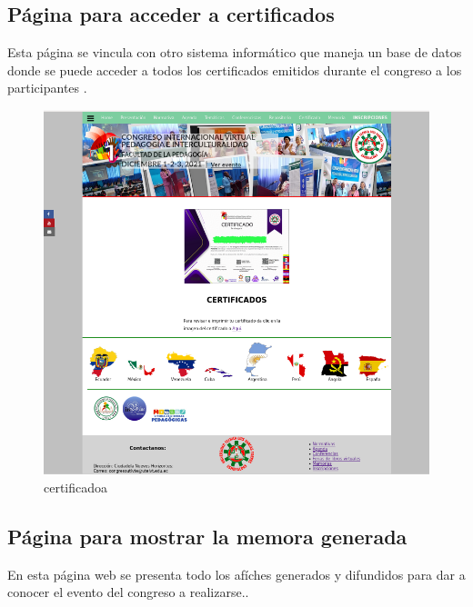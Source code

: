 \documentclass[a4paper,14px]{article}
\begin{document}
\newpage
\subsection{Página para acceder a certificados }
\label{sec:pagina-principal}

Esta página se vincula con otro sistema informático que maneja un base de datos donde se puede acceder a todos los certificados emitidos durante el congreso a los participantes
.



\begin{figure}[H]
  \centering
  \includegraphics[scale=0.6]{certificado.png}
  \caption{certificadoa}
  \label{fig:arquitectura}
\end{figure}


\newpage
\subsection{Página para mostrar la memora generada}
\label{sec:pagina-principal}

En esta página web se presenta todo los afíches generados y difundidos para dar a conocer el evento del congreso a realizarse..
\end{document}
